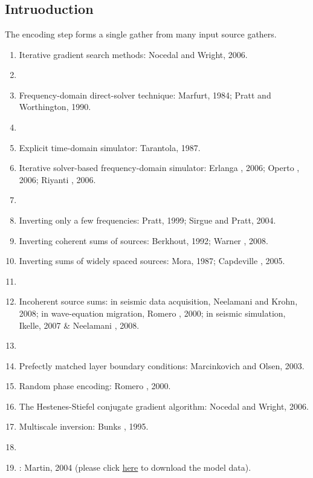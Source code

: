 \renewcommand{\pmk}{Krebs\_2009\_Geophy\_FFW using encoded sources}
\renewcommand{\prf}{FWI/\pmk.pdf}
\renewcommand{\pti}{Fast full-wavefield seismic inversion
using encoded sources}
\renewcommand{\pay}{Jerome R. Krebs, John E. Anderson, David Hinkley
\etal, 2009}
\renewcommand{\pjo}{Geophysics}
\renewcommand{\pda}{2019/3/28 Thu.}

\section{\pinfo}

\subsection{Intruoduction}
The encoding step forms a single gather from many input source gathers.

\begin{enumerate}[\hspace{10mm}*]
  \item Iterative gradient search methods: Nocedal and Wright, 2006.
  \item \sline
  \item Frequency-domain direct-solver technique: Marfurt, 1984;
    Pratt and Worthington, 1990.
  \item \sline
  \item Explicit time-domain simulator: Tarantola, 1987.
  \item Iterative solver-based frequency-domain simulator: Erlanga \etal, 2006;
    Operto \etal, 2006; Riyanti \etal, 2006.
  \item \sline
  \item Inverting only a few frequencies: Pratt, 1999; Sirgue and Pratt, 2004.
  \item Inverting coherent sums of sources: Berkhout, 1992; Warner \etal, 2008.
  \item Inverting sums of widely spaced sources: Mora, 1987;
    Capdeville \etal, 2005.
  \item \sline
  \item Incoherent source sums:
    in seismic data acquisition, Neelamani and Krohn, 2008;
    in wave-equation migration, Romero \etal, 2000;
    in seismic simulation, Ikelle, 2007 \& Neelamani \etal, 2008.
  \item \sline
  \item Prefectly matched layer boundary conditions:
    Marcinkovich and Olsen, 2003.
  \item Random phase encoding: Romero \etal, 2000.
  \item The Hestenes-Stiefel conjugate gradient algorithm:
    Nocedal and Wright, 2006.
  \item Multiscale inversion: Bunks \etal, 1995.
  \item \sline
  \item {}
    :
    Martin, 2004 (please click \href{http://www.agl.uh.edu/downloads/downloads.htm}{here}
    to download the model data).
\end{enumerate}

